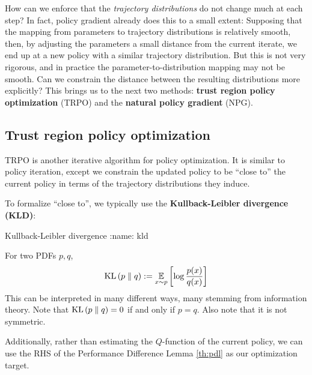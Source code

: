 \documentclass[\main/main]{subfiles}
\begin{document}
How can we enforce that the \emph{trajectory distributions} do not change much at each step?
In fact, policy gradient already does this to a small extent: Supposing that the mapping from parameters to trajectory distributions is relatively smooth, then, by adjusting the parameters a small distance from the current iterate, we end up at a new policy with a similar trajectory distribution.
But this is not very rigorous, and in practice the parameter-to-distribution mapping may not be smooth. Can we constrain the distance between the resulting distributions more explicitly?
This brings us to the next two methods: \textbf{trust region policy optimization} (TRPO) and the \textbf{natural policy gradient} (NPG).

\subsection{Trust region policy optimization}

TRPO is another iterative algorithm for policy optimization. It is similar to policy iteration, except we constrain the updated policy to be ``close to'' the current policy in terms of the trajectory distributions they induce.

To formalize ``close to'', we typically use the \textbf{Kullback-Leibler divergence (KLD)}:

\begin{definition}{Kullback-Leibler divergence}
:name: kld

    For two PDFs $p, q$,
    \begin{equation}
        \mathrm{KL}\left(p \parallel q\right) := \operatorname*{\mathbb{E}}_{x \sim p} \left[ \log \frac{p(x)}{q(x)} \right]
    \end{equation}
    This can be interpreted in many different ways, many stemming from information theory.
    Note that $\mathrm{KL}\left(p \parallel q\right) = 0$ if and only if $p = q$. Also note that it is not symmetric.
\end{definition}



Additionally, rather than estimating the $Q$-function of the current policy, we can use the RHS of the Performance Difference Lemma \eqref{th:pdl} as our optimization target.
\end{document}

